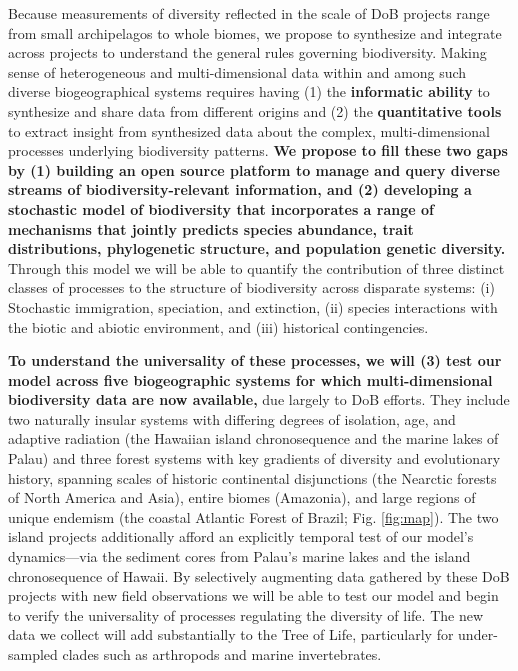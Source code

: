 \documentclass[11pt]{article}
\begin{document}
Because measurements of diversity reflected in the scale of DoB
projects range from small archipelagos to whole biomes, we propose to
synthesize and integrate across projects to understand the general
rules governing biodiversity. Making sense of heterogeneous and
multi-dimensional data within and among such diverse biogeographical
systems requires having (1) the \textbf{informatic ability} to
synthesize and share data from different origins and (2) the
\textbf{quantitative tools} to extract insight from synthesized data
about the complex, multi-dimensional processes underlying biodiversity
patterns. \textbf{We propose to fill these two gaps by (1) building an
  open source platform to manage and query diverse streams of
  biodiversity-relevant information, and (2) developing a stochastic
  model of biodiversity that incorporates a range of mechanisms that
  jointly predicts species abundance, trait distributions,
  phylogenetic structure, and population genetic diversity.}  Through
this model we will be able to quantify the contribution of three
distinct classes of processes to the structure of biodiversity across
disparate systems: (i) Stochastic immigration, speciation, and
extinction, (ii) species interactions with the biotic and abiotic
environment, and (iii) historical contingencies.

\textbf{To understand the universality of these processes, we will (3)
  test our model across five biogeographic systems for which
  multi-dimensional biodiversity data are now available,} due largely
to DoB efforts. They include two naturally insular systems with
differing degrees of isolation, age, and adaptive radiation (the
Hawaiian island chronosequence and the marine lakes of Palau) and
three forest systems with key gradients of diversity and evolutionary
history, spanning scales of historic continental disjunctions (the
Nearctic forests of North America and Asia), entire biomes (Amazonia),
and large regions of unique endemism (the coastal Atlantic Forest of
Brazil; Fig. \ref{fig:map}). The two island projects additionally
afford an explicitly temporal test of our model's dynamics---via the
sediment cores from Palau's marine lakes and the island chronosequence
of Hawaii. By selectively augmenting data gathered by these DoB
projects with new field observations we will be able to test our model
and begin to verify the universality of processes regulating the
diversity of life. The new data we collect will add substantially to
the Tree of Life, particularly for under-sampled clades such as
arthropods and marine invertebrates.
\end{document}
